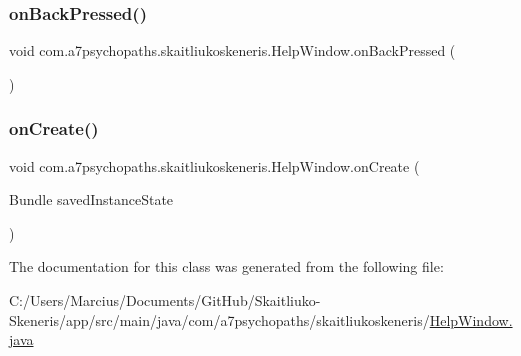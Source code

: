 \subsubsection{\texorpdfstring{on\+Back\+Pressed()}{onBackPressed()}}
{\footnotesize\ttfamily void com.\+a7psychopaths.\+skaitliukoskeneris.\+Help\+Window.\+on\+Back\+Pressed (\begin{DoxyParamCaption}{ }\end{DoxyParamCaption})}

\mbox{\label{classcom_1_1a7psychopaths_1_1skaitliukoskeneris_1_1_help_window_a272adb54e310ca2214d4b8f7920ba7d4}} 
\subsubsection{\texorpdfstring{on\+Create()}{onCreate()}}
{\footnotesize\ttfamily void com.\+a7psychopaths.\+skaitliukoskeneris.\+Help\+Window.\+on\+Create (\begin{DoxyParamCaption}\item[{Bundle}]{saved\+Instance\+State }\end{DoxyParamCaption})\hspace{0.3cm}{\ttfamily [protected]}}



The documentation for this class was generated from the following file\+:\begin{DoxyCompactItemize}
\item 
C\+:/\+Users/\+Marcius/\+Documents/\+Git\+Hub/\+Skaitliuko-\/\+Skeneris/app/src/main/java/com/a7psychopaths/skaitliukoskeneris/\mbox{\hyperlink{_help_window_8java}{Help\+Window.\+java}}\end{DoxyCompactItemize}
